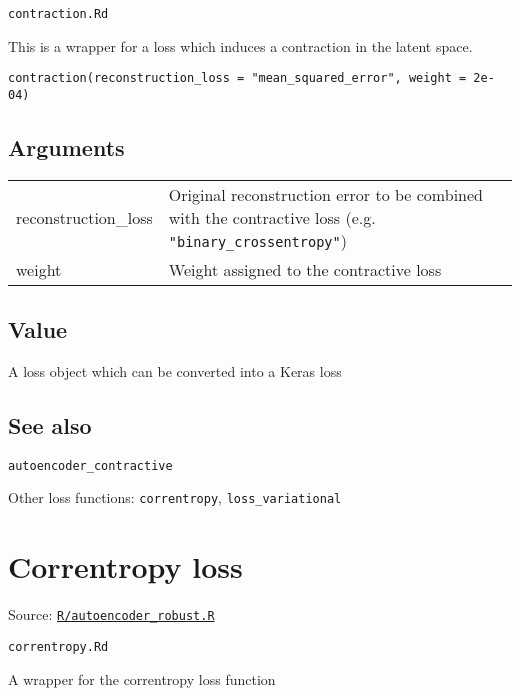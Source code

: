 \texttt{contraction.Rd}

This is a wrapper for a loss which induces a contraction in the latent
space.

\begin{verbatim}
contraction(reconstruction_loss = "mean_squared_error", weight = 2e-04)
\end{verbatim}

\hypertarget{arguments}{\subsection{\texorpdfstring{\protect\hyperlink{arguments}{}Arguments}{Arguments}}\label{arguments}}

\begin{longtable}[c]{@{}ll@{}}
\toprule
reconstruction\_loss & Original reconstruction error to be combined with
the contractive loss (e.g.
\texttt{"binary\_crossentropy"})\tabularnewline
weight & Weight assigned to the contractive loss\tabularnewline
\bottomrule
\end{longtable}

\hypertarget{value}{\subsection{\texorpdfstring{\protect\hyperlink{value}{}Value}{Value}}\label{value}}

A loss object which can be converted into a Keras loss

\hypertarget{see-also}{\subsection{\texorpdfstring{\protect\hyperlink{see-also}{}See
also}{See also}}\label{see-also}}

\texttt{autoencoder\_contractive}

Other loss functions: \texttt{correntropy}, \texttt{loss\_variational}

\section{Correntropy loss}\label{correntropy-loss}

Source:
\href{https://github.com/fdavidcl/ruta/blob/master/R/autoencoder_robust.R}{\texttt{R/autoencoder\_robust.R}}

\texttt{correntropy.Rd}

A wrapper for the correntropy loss function


